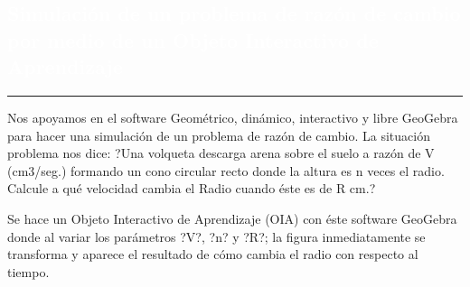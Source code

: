 \begin{titlepage}
\pagecolor{white}
\newcommand{\R}{\ensuremath{\mathbb{R}}}
\BgThispage
{}
\vspace*{-1.1cm}
\noindent
\def\titulo#1{\section{#1}}

\section{\bf\large\textcolor{white}{Simulaci\'on de un problema de raz\'on de cambio por medio de un Objeto Interactivo de Aprendizaje}}
\vspace*{2cm}\par
\noindent

\begin{minipage}{0.5\linewidth}
\begin{minipage}{0.45\linewidth}
    \begin{flushright}
        \printauthor
    \end{flushright}
\end{minipage} \hspace{-3pt}
%
\begin{minipage}{0.02\linewidth}
   \color{ptctitle} \rule{1pt}{245pt}
\end{minipage} 
\end{minipage}
\hspace*{-4.5cm}
\begin{minipage}{0.85\linewidth}
\begin{minipage}{0.85\linewidth}
\footnotesize
\vspace{5pt}
    \begin{resumen}
    Nos apoyamos en el software Geom\'etrico, din\'amico, interactivo y libre GeoGebra  para hacer una simulaci\'on de un problema de raz\'on de cambio. La situaci\'on problema nos dice: ?Una volqueta descarga arena sobre el suelo a raz\'on de V (cm3/seg.) formando un cono circular recto donde la altura es  n veces el radio. Calcule a qu\'e velocidad cambia el Radio cuando \'este es de R cm.?     

Se hace un Objeto Interactivo de Aprendizaje (OIA)  con \'este software GeoGebra donde al variar los par\'ametros ?V?, ?n? y ?R?; la figura inmediatamente se transforma y aparece el resultado de c\'omo cambia el radio con respecto al tiempo.


\end{resumen}
\end{minipage}
\end{minipage}
\end{titlepage}
